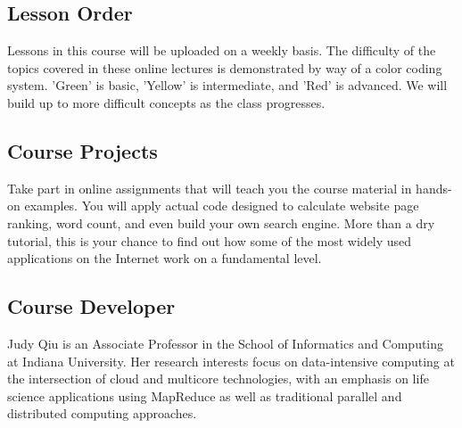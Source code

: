 \subsection{Lesson Order}
Lessons in this course will be uploaded on a weekly basis. The difficulty of
the topics covered in these online lectures is demonstrated by way of a color
coding system. 'Green' is basic, 'Yellow' is intermediate, and 'Red' is
advanced. We will build up to more difficult concepts as the class progresses.

\subsection{Course Projects}
Take part in online assignments that will teach you the course material in
hands-on examples. You will apply actual code designed to calculate website
page ranking, word count, and even build your own search engine. More than a
dry tutorial, this is your chance to find out how some of the most widely used
applications on the Internet work on a fundamental level.

\subsection{Course Developer}
Judy Qiu is an Associate Professor in the School of Informatics and Computing
at Indiana University. Her research interests focus on data-intensive
computing at the intersection of cloud and multicore technologies, with an
emphasis on life science applications using MapReduce as well as traditional
parallel and distributed computing approaches.


